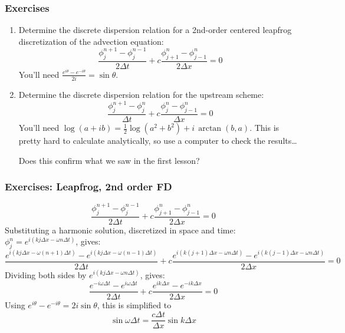 \documentclass[aspectratio=43,9pt]{beamer}
\begin{document}
\begin{frame}
	\frametitle{Exercises}
	\begin{enumerate}
		\item Determine the discrete dispersion relation for a 2nd-order centered leapfrog discretization of the advection equation:
			\begin{equation*}
				\frac{\phi_j^{n+1}-\phi_j^{n-1}}{2\Delta t}+c\frac{\phi^n_{j+1}-\phi^n_{j-1}}{2\Delta x}=0
			\end{equation*}
			You'll need $\frac{e^{i\theta}-e^{-i\theta}}{2i}=\sin\theta$.\vspace*{6ex}
		\item Determine the discrete dispersion relation for the upstream scheme:
			\begin{equation*}
				\frac{\phi_j^{n+1}-\phi_j^{n}}{\Delta t}+c\frac{\phi^n_{j}-\phi^n_{j-1}}{\Delta x}=0
			\end{equation*}
			You'll need $\log (a+ib)=\frac{1}{2}\log(a^2+b^2)+i\,\arctan(b,a)$. This is pretty hard to calculate analytically, so use a computer to check the results\ldots
			\par
			Does this confirm what we saw in the first lesson?
	\end{enumerate}
\end{frame}
%
%
\begin{frame}
	\frametitle{Exercises: Leapfrog, 2nd order FD}
	\begin{equation*}
		\frac{\phi_j^{n+1}-\phi_j^{n-1}}{2\Delta t}+c\frac{\phi^n_{j+1}-\phi^n_{j-1}}{2\Delta x}=0
	\end{equation*}
\pause
	Substituting a harmonic solution, discretized in space and time: $\phi_j^n=e^{i(kj\Delta x-\omega n \Delta t)}$, gives:
	\begin{equation*}
		\frac{e^{i(kj\Delta x-\omega (n+1)\Delta t)}-e^{i(kj\Delta x-\omega (n-1)\Delta t)}}{2\Delta t}+c\frac{e^{i(k(j+1)\Delta x-\omega n\Delta t)}-e^{i(k(j-1)\Delta x-\omega n\Delta t)}}{2\Delta x}=0
	\end{equation*}	
\pause
	Dividing both sides by $e^{i(kj\Delta x-\omega n\Delta t)}$, gives:
	\begin{equation*}
		\frac{e^{-i\omega\Delta t}-e^{i\omega\Delta t}}{2\Delta t}+c\frac{e^{ik\Delta x}-e^{-ik\Delta x}}{2\Delta x}=0
	\end{equation*}
\pause
	Using $e^{i\theta}-e^{-i\theta}=2i\sin\theta$, this is simplified to
	\begin{equation*}
		\sin\omega\Delta t=\frac{c\Delta t}{\Delta x}\sin k\Delta x
	\end{equation*}
\end{frame}
\end{document}
